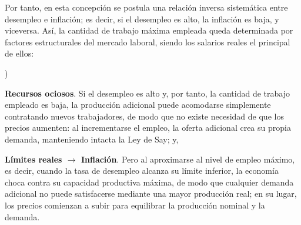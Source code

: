 \documentclass[10pt,a4paper]{article}
\newcounter{alphaitem}
\newenvironment{la}
      {\begin{list}{\alph{alphaitem})}{%
          \usecounter{alphaitem}%
          \setlength{\leftmargin}{1cm}%
          \setlength{\parskip}{3pt}%
          \setlength{\itemsep}{0pt}%
          \setlength{\parsep}{0pt}%
      }}
      {\end{list}}
\begin{document}
Por tanto, en esta concepción se postula una relación inversa sistemática entre desempleo e inflación; es decir, si el desempleo es alto, la inflación es baja, y viceversa. Así, la cantidad de trabajo máxima empleada queda determinada por factores estructurales del mercado laboral, siendo los salarios reales el principal de ellos:
\begin{la}
    \item \textbf{Recursos ociosos}. Si el desempleo es alto y, por tanto, la cantidad de trabajo empleado es baja, la producción adicional puede acomodarse simplemente contratando nuevos trabajadores, de modo que no existe necesidad de que los precios aumenten: al incrementarse el empleo, la oferta adicional crea su propia demanda, manteniendo intacta la Ley de Say; y, 
    \item \textbf{Límites reales $\to$ Inflación}. Pero al aproximarse al nivel de empleo máximo, es decir, cuando la tasa de desempleo alcanza su límite inferior, la economía choca contra su capacidad productiva máxima, de modo que cualquier demanda adicional no puede satisfacerse mediante una mayor producción real; en su lugar, los precios comienzan a subir para equilibrar la producción nominal y la demanda.
\end{la}
\end{document}
